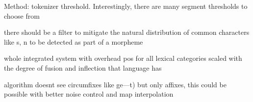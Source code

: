 Method: tokenizer threshold.
Interestingly, there are many segment thresholds to choose from

there should be a filter to mitigate the natural distribution of common characters like s, n to be detected as  part of a morpheme

whole integrated system with overhead pos for all lexical categories
scaled with the degree of fusion and inflection that language has

algorithm doesnt see circumfixes like ge---t) but only affixes, this could be possible with better noise control and map interpolation
